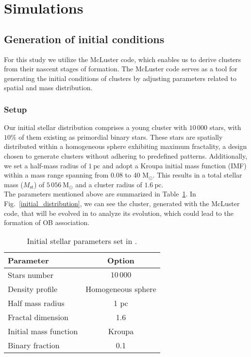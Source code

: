 \documentclass[baaa]{baaa}
\begin{document}
\section{Simulations}\label{Simulations}
\subsection{Generation of initial conditions}

{For this study we utilize the {\sc McLuster} code, which enables us to derive clusters from their nascent stages of formation. The {\sc McLuster} code serves as a tool for generating the initial conditions of clusters by adjusting parameters related to spatial and mass distribution.}

\subsubsection{Setup}
Our initial stellar distribution comprises a young cluster with $10\,000$ stars, with $10\%$ of them existing as primordial binary stars. These stars are spatially distributed within a homogeneous sphere exhibiting maximum fractality, a design chosen to generate clusters without adhering to predefined patterns. Additionally, we set a half-mass radius of $1~\mathrm{pc}$ and adopt a Kroupa initial mass function (IMF) within a mass range spanning from 0.08 to 40 M$_\odot$. This results in a total stellar mass ($M${$_{\mathrm{st}}$}) of {$5\,056~\mathrm{M_\odot}$} and a cluster radius of {$1.6~\mathrm{pc}$}.\\
The parameters mentioned above are summarized in Table~\ref{mcluster_parameters}. In Fig.~\ref{initial_distribution}, we can see the cluster, {generated with the {\sc McLuster} code},  that will be evolved in {} to analyze its evolution, which could lead to the formation of OB association.

\begin{table}[!t]
\centering
\caption{Initial stellar parameters set in {}.}
\begin{tabular}{lc}
\hline\hline\noalign{\smallskip}
\!\!Parameter & \!\!\!\! Option\\
\hline\noalign{\smallskip}
\!\!Stars number & {$10\,000$}\\
\!\!Density profile & Homogeneous sphere\\
\!\!Half mass radius & 1 pc\\
\!\!Fractal dimension & 1.6\\
\!\!Initial mass function & Kroupa\\
\!\!Binary fraction & 0.1\\
\hline
\end{tabular}
\label{mcluster_parameters}
\end{table}
\end{document}
